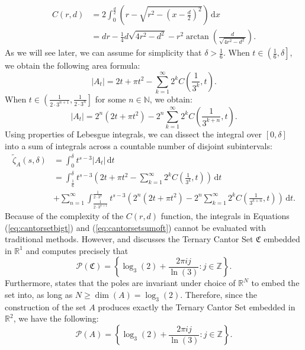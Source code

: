 \documentclass{article}
\theoremstyle{plain}
\numberwithin{equation}{section}
\numberwithin{table}{section}
\numberwithin{figure}{section}
\newcommand{\vaddspace}[1]{\rule{0pt}{#1pt}}
\newcommand{\newparagraph}{\vaddspace{10}}
\begin{document}
\begin{align}
C(r,d) &= 2\int_0^{\frac{d}{2}} \left(r - \sqrt{r^2 - \left(x-\frac{d}{2}\right)^2}\right) \,\mathrm{d}x \nonumber\\
&= dr - \frac{1}{4} d \sqrt{4r^2 - d^2} - r^2 \arctan\left(\frac{d}{\sqrt{4r^2 - d^2}}\right) \label{eq:cusparea}.
\end{align}
As we will see later, we can assume for simplicity that $\delta > \frac{1}{6}$. When $t \in \left(\frac{1}{6}, \delta\right]$, we obtain the following area formula:
\begin{equation}
|A_t| = 2t + \pi t^2 - \sum_{k=1}^{\infty} 2^k C\left(\frac{1}{3^k}, t\right).
\end{equation}
When $t \in \left(\frac{1}{2\cdot3^{n+1}}, \frac{1}{2\cdot3^n}\right]$ for some $n \in \mathbb{N}$, we obtain:
\begin{equation}
|A_t| = 2^n (2t + \pi t^2) - 2^n \sum_{k=1}^{\infty} 2^k C\left(\frac{1}{3^{k+n}}, t\right).
\end{equation}
Using properties of Lebesgue integrals, we can dissect the integral over $[0,\delta]$ into a sum of integrals across a countable number of disjoint subintervals:
\begin{align}
\tilde{\zeta}_A(s,\delta) &= \int_0^{\delta} t^{s-3} |A_t| \,\mathrm{d}t \nonumber\\
&= \int_{\frac{1}{6}}^{\delta} t^{s-3} \left(2t + \pi t^2 - \sum_{k=1}^{\infty} 2^k C\left(\frac{1}{3^k}, t\right)\right) \,\mathrm{d}t \label{eq:cantorsetbigt}\\
&+ \sum_{n=1}^{\infty} \int_{\frac{1}{2\cdot3^{n+1}}}^{\frac{1}{2\cdot3^n}} t^{s-3} \left(2^n (2t + \pi t^2) - 2^n \sum_{k=1}^{\infty} 2^k C\left(\frac{1}{3^{k+n}}, t\right)\right) \,\mathrm{d}t. \label{eq:cantorsetsumoft}
\end{align}
Because of the complexity of the $C(r,d)$ function, the integrals in Equations (\ref{eq:cantorsetbigt}) and (\ref{eq:cantorsetsumoft}) cannot be evaluated with traditional methods. However, \cite[Example 2.3.31]{lapidusbook} and \cite[Sections 1.1 and 1.2]{lapidusbook3} discusses the Ternary Cantor Set $\mathfrak{C}$ embedded in $\mathbb{R}^1$ and computes precisely that
\begin{equation}
\mathscr{P}(\mathfrak{C}) = \left\{\log_3(2) + \frac{2\pi i j}{\ln(3)} : j \in \mathbb{Z}\right\}.
\end{equation}
Furthermore, \cite[Theorem 4.7.3]{lapidusbook} states that the poles are invariant under choice of $\mathbb{R}^N$ to embed the set into, as long as $N \geq \dim(A) = \log_3(2)$. Therefore, since the construction of the set $A$ produces exactly the Ternary Cantor Set embedded in $\mathbb{R}^2$, we have the following:
\begin{equation}
\mathscr{P}(A) = \left\{\log_3(2) + \frac{2\pi i j}{\ln(3)} : j \in \mathbb{Z}\right\}.
\end{equation}
\newparagraph
\end{document}
